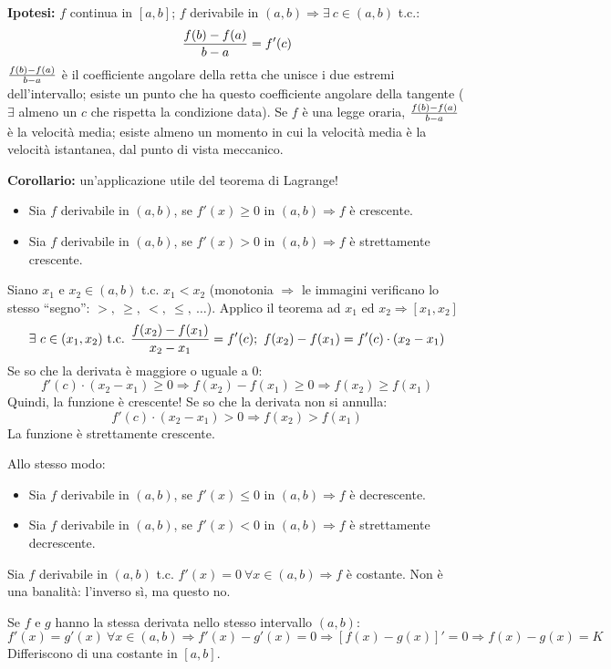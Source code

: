 \documentclass[12pt,a4paper]{article}
\begin{document}
\textbf{Ipotesi:} $f$ continua in $[a,b]$; $f$ derivabile in $(a,b) 
\Rightarrow \exists \ c \in (a,b)$ t.c.:
$$ {f(b) - f(a) \over b - a} = f'(c) $$
${f(b) - f(a) \over b - a}$ \`e il coefficiente angolare della retta 
che unisce i due estremi dell'intervallo; esiste un punto che ha
questo coefficiente angolare della tangente ($\exists$ almeno un
$c$ che rispetta la condizione data). Se $f$ \`e una legge oraria,
${f(b) - f(a) \over b - a}$ \`e la velocit\`a media; esiste almeno
un momento in cui la velocit\`a media \`e la velocit\`a istantanea,
dal punto di vista meccanico.

\textbf{Corollario:} un'applicazione utile del teorema di Lagrange!

\begin{itemize}
\item   Sia $f$ derivabile in $(a,b)$, se $f'(x) \geq 0$ in $(a,b) 
        \Rightarrow f$ \`e crescente.
\item   Sia $f$ derivabile in $(a,b)$, se $f'(x) > 0$ in $(a,b) 
        \Rightarrow f$ \`e strettamente crescente.
\end{itemize}

Siano $x_1$ e $x_2 \in (a,b)$ t.c. $x_1 < x_2$ (monotonia 
$\Rightarrow$ le immagini verificano lo stesso ``segno'':
 $>, \ \geq, \ <, \ \leq, \ \dots$). Applico il teorema ad $x_1$ ed
 $x_2 \Rightarrow [x_1, x_2]$
$$ \exists \ c \in (x_1, x_2) \text{ t.c. } { f(x_2) - f(x_1) \over
x_2 - x_1} = f'(c) ; \ f(x_2) - f(x_1) = f'(c)\cdot(x_2 - x_1) $$
Se so che la derivata \`e maggiore o uguale a $0$:
$$ f'(c) \cdot (x_2 - x_1) \geq 0 \Rightarrow f(x_2) - f(x_1) \geq 0
\Rightarrow f(x_2) \geq f(x_1) $$
Quindi, la funzione \`e crescente! Se so che la derivata non
si annulla:
$$ f'(c) \cdot (x_2 - x_1) > 0 \Rightarrow f(x_2) > f(x_1) $$
La funzione \`e strettamente crescente.

Allo stesso modo:
\begin{itemize}
\item   Sia $f$ derivabile in $(a,b)$, se $f'(x) \leq 0$ in $(a,b) 
        \Rightarrow f$ \`e decrescente.
\item   Sia $f$ derivabile in $(a,b)$, se $f'(x) < 0$ in $(a,b) 
        \Rightarrow f$ \`e strettamente decrescente.
\end{itemize}

Sia $f$ derivabile in $(a,b)$ t.c. $f'(x) = 0 \ \forall x \in (a,b)
\Rightarrow f $ \`e costante. Non \`e una banalit\`a: l'inverso
s\`i, ma questo no.

Se $f$ e $g$ hanno la stessa derivata nello stesso intervallo
$(a,b)$:
$$ f'(x) = g'(x) \ \forall x \in (a,b) \Rightarrow
f'(x) - g'(x) = 0 \Rightarrow \left[ f(x) - g(x) \right]' = 0
\Rightarrow f(x) - g(x) = K $$
Differiscono di una costante in $[a,b]$.
\end{document}
